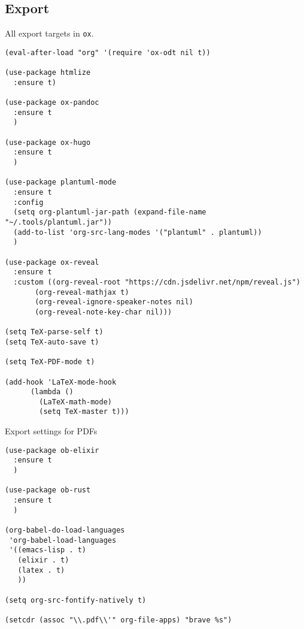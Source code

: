 \documentclass[11pt]{article}
\begin{document}
\subsection{Export}
\label{sec:org5282ca4}
All export targets in \texttt{ox}.
\begin{verbatim}
(eval-after-load "org" '(require 'ox-odt nil t))

(use-package htmlize
  :ensure t)

(use-package ox-pandoc
  :ensure t
  )

(use-package ox-hugo
  :ensure t
  )

(use-package plantuml-mode
  :ensure t
  :config
  (setq org-plantuml-jar-path (expand-file-name "~/.tools/plantuml.jar"))
  (add-to-list 'org-src-lang-modes '("plantuml" . plantuml))
  )

(use-package ox-reveal
  :ensure t
  :custom ((org-reveal-root "https://cdn.jsdelivr.net/npm/reveal.js")
	   (org-reveal-mathjax t)
	   (org-reveal-ignore-speaker-notes nil)
	   (org-reveal-note-key-char nil)))

(setq TeX-parse-self t)
(setq TeX-auto-save t)

(setq TeX-PDF-mode t)

(add-hook 'LaTeX-mode-hook
	  (lambda ()
	    (LaTeX-math-mode)
	    (setq TeX-master t)))
\end{verbatim}
Export settings for PDFs
\begin{verbatim}
(use-package ob-elixir
  :ensure t
  )

(use-package ob-rust
  :ensure t
  )

(org-babel-do-load-languages
 'org-babel-load-languages
 '((emacs-lisp . t)
   (elixir . t)
   (latex . t)
   ))

(setq org-src-fontify-natively t)

(setcdr (assoc "\\.pdf\\'" org-file-apps) "brave %s")
\end{verbatim}
\end{document}
